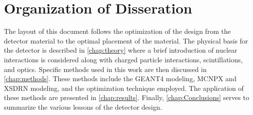 \section{Organization of Disseration}
The layout of this document follows the optimization of the design from the detector material to the optimal placement of the material.
The physical basis for the detector is described in \autoref{chap:theory} where a brief introduction of nuclear interactions is considered along with charged particle interactions, scintillations, and optics.
Specific methods used in this work are then discussed in \autoref{chap:methods}.
These methods include the GEANT4 modeling, MCNPX and XSDRN modeling, and the optimization technique employed.
The application of these methods are presented in \autoref{chap:results}.
Finally, \autoref{chap:Conclusions} serves to summarize the various lessons of the detector design.
